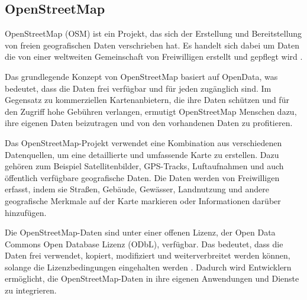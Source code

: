 \subsection{OpenStreetMap}
OpenStreetMap (OSM) ist ein Projekt, das sich der Erstellung und Bereitstellung von freien
geografischen Daten verschrieben hat. Es handelt sich dabei um Daten die von einer weltweiten
Gemeinschaft von Freiwilligen erstellt und gepflegt wird \cite{osm.about}.

Das grundlegende Konzept von OpenStreetMap basiert auf OpenData, was bedeutet, dass die Daten frei
verfügbar und für jeden zugänglich sind. Im Gegensatz zu kommerziellen Kartenanbietern, die ihre
Daten schützen und für den Zugriff hohe Gebühren verlangen, ermutigt OpenStreetMap Menschen dazu,
ihre eigenen Daten beizutragen und von den vorhandenen Daten zu profitieren.

Das OpenStreetMap-Projekt verwendet eine Kombination aus verschiedenen Datenquellen, um eine
detaillierte und umfassende Karte zu erstellen. Dazu gehören zum Beispiel Satellitenbilder,
GPS-Tracks, Luftaufnahmen und auch öffentlich verfügbare geografische Daten. Die Daten werden von
Freiwilligen erfasst, indem sie Straßen, Gebäude, Gewässer, Landnutzung und andere geografische
Merkmale auf der Karte markieren oder Informationen darüber hinzufügen.

Die OpenStreetMap-Daten sind unter einer offenen Lizenz, der Open Data Commons Open Database Lizenz
(ODbL), verfügbar. Das bedeutet, dass die Daten frei verwendet, kopiert, modifiziert und
weiterverbreitet werden können, solange die Lizenzbedingungen eingehalten werden \cite{osm.license}.
Dadurch wird Entwicklern ermöglicht, die OpenStreetMap-Daten in ihre eigenen Anwendungen und
Dienste zu integrieren.